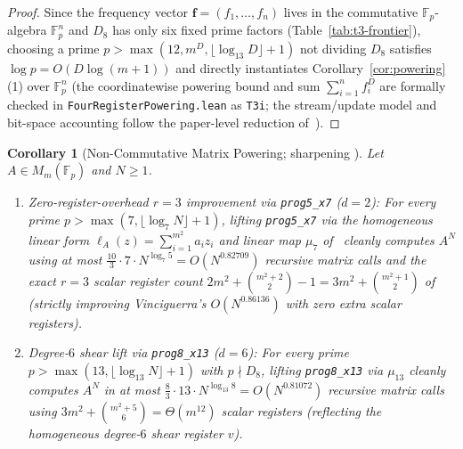 \documentclass[11pt,reqno]{amsart}
\newtheorem{corollary}[theorem]{Corollary}
\theoremstyle{definition}
\newcommand{\F}{\mathbb{F}}
\begin{document}
\begin{proof}
Since the frequency vector $\mathbf{f} = (f_1, \dots, f_n)$ lives in the commutative $\F_p$-algebra $\F_p^n$ and $D_8$ has only six fixed prime factors (Table~\ref{tab:t3-frontier}), choosing a prime $p > \max(12, m^D, \lfloor \log_{13} D \rfloor + 1)$ not dividing $D_8$ satisfies $\log p = O(D \log(m + 1))$ and directly instantiates Corollary~\ref{cor:powering}(1) over $\F_p^n$ (the coordinatewise powering bound and sum $\sum_{i=1}^n f_i^D$ are formally checked in \texttt{Four\allowbreak Register\allowbreak Powering.lean} as \texttt{T3i}; the stream/update model and bit-space accounting follow the paper-level reduction of~\cite[Theorem~5.1 and Corollary~5.1.1]{Vinciguerra2026}).
\end{proof}

\begin{corollary}[Non-Commutative Matrix Powering; sharpening {\cite[Theorem~5.2]{Vinciguerra2026}}]
\label{cor:matpow}
Let $A \in M_m(\F_p)$ and $N \ge 1$.
\begin{enumerate}
  \item \emph{Zero-register-overhead $r = 3$ improvement via \texttt{prog5\_x7} ($d = 2$):}
  For every prime $p > \max(7, \lfloor \log_7 N \rfloor + 1)$, lifting \texttt{prog5\_x7} via the homogeneous linear form $\ell_A(z) = \sum_{i=1}^{m^2} a_i z_i$ and linear map $\mu_7$ of~\cite[\S4.4, Theorem~5.2]{Vinciguerra2026} cleanly computes $A^N$ using at most $\frac{10}{3} \cdot 7 \cdot N^{\log_7 5} = O(N^{0.82709})$ recursive matrix calls and the \emph{exact} $r = 3$ scalar register count $2m^2 + \binom{m^2 + 2}{2} - 1 = 3m^2 + \binom{m^2 + 1}{2}$ of~\cite[Theorem~5.2]{Vinciguerra2026} (strictly improving Vinciguerra's $O(N^{0.86136})$ with zero extra scalar registers).
  \item \emph{Degree-$6$ shear lift via \texttt{prog8\_x13} ($d = 6$):}
  For every prime $p > \max(13, \lfloor \log_{13} N \rfloor + 1)$ with $p \nmid D_8$, lifting \texttt{prog8\_x13} via $\mu_{13}$ cleanly computes $A^N$ in at most $\frac{8}{3} \cdot 13 \cdot N^{\log_{13} 8} = O(N^{0.81072})$ recursive matrix calls using $3m^2 + \binom{m^2 + 5}{6} = \Theta(m^{12})$ scalar registers (reflecting the homogeneous degree-$6$ shear register $v$).
\end{enumerate}
\end{corollary}
\end{document}
